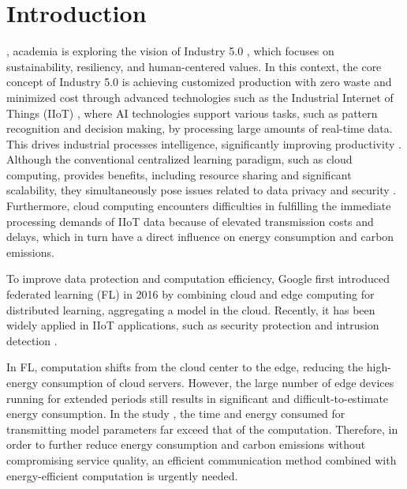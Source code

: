 \documentclass[journal]{IEEEtran}
\begin{document}
\section{Introduction}
, academia is exploring the vision of Industry 5.0 \cite{zeb2024towards_industry5.0,leng2024unlocking_industry5.0}, which focuses on sustainability, resiliency, and human-centered values. In this context, the core concept of Industry 5.0 is achieving customized production with zero waste and minimized cost through advanced technologies such as the Industrial Internet of Things (IIoT) \cite{zeb2024towards_industry5.0,10440434}, where AI technologies support various tasks, such as pattern recognition and decision making, by processing large amounts of real-time data. This drives industrial processes intelligence, significantly improving productivity \cite{liu2024federated_sensors, de2024spatio_agriculture}. Although the conventional centralized learning paradigm, such as cloud computing, provides benefits, including resource sharing and significant scalability, they simultaneously pose issues related to data privacy and security \cite{boobalan2022fusion}. Furthermore, cloud computing encounters difficulties in fulfilling the immediate processing demands of IIoT data because of elevated transmission costs and delays, which in turn have a direct influence on energy consumption and carbon emissions.



To improve data protection and computation efficiency, Google first introduced federated learning (FL) in 2016 \cite{fedavg_google} by combining cloud and edge computing for distributed learning, aggregating a model in the cloud. Recently, it has been widely applied in IIoT applications, such as security protection \cite{salim2024fl_securityguard} and intrusion detection \cite{rashid2023federated_invasion}. 

In FL, computation shifts from the cloud center to the edge, reducing the high-energy consumption of cloud servers. However, the large number of edge devices running for extended periods still results in significant and difficult-to-estimate energy consumption. In the study \cite{liu_hierarchical_2023}, the time and energy consumed for transmitting model parameters far exceed that of the computation. Therefore, in order to further reduce energy consumption and carbon emissions without compromising service quality, an efficient communication method combined with energy-efficient computation is urgently needed.
\end{document}
